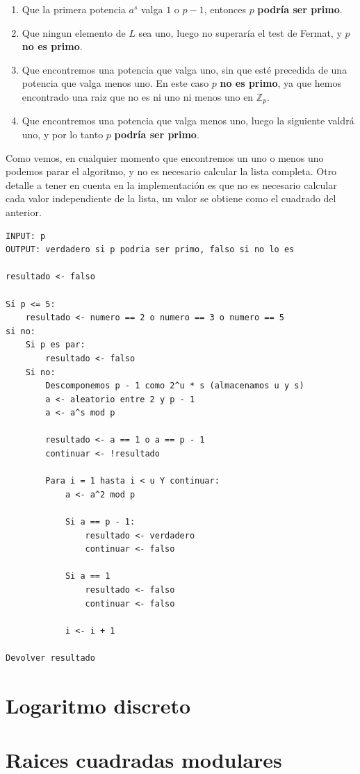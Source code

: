 \documentclass[12pt, spanish]{article}
\begin{document}
\begin{enumerate}
	\item Que la primera potencia $a^s$ valga $1$ o $p - 1$, entonces $p$ \textbf{podría ser primo}.
	\item Que ningun elemento de $L$ sea uno, luego no superaría el test de Fermat, y $p$ \textbf{no es primo}.
	\item Que encontremos una potencia que valga uno, sin que esté precedida de una potencia que valga menos uno. En este caso $p$ \textbf{no es primo}, ya que hemos encontrado una raiz que no es ni uno ni menos uno en $\mathbb{Z}_p$.
	\item Que encontremos una potencia que valga menos uno, luego la siguiente valdrá uno, y por lo tanto $p$ \textbf{podría ser primo}.
\end{enumerate}

Como vemos, en cualquier momento que encontremos un uno o menos uno podemos parar el algoritmo, y no es necesario calcular la lista completa. Otro detalle a tener en cuenta en la implementación es que no es necesario calcular cada valor independiente de la lista, un valor se obtiene como el cuadrado del anterior.

\begin{lstlisting}[caption={Test de Miller-Rabin}]
INPUT: p
OUTPUT: verdadero si p podria ser primo, falso si no lo es

resultado <- falso

Si p <= 5:
	resultado <- numero == 2 o numero == 3 o numero == 5
si no:
	Si p es par:
		resultado <- falso
	Si no:
		Descomponemos p - 1 como 2^u * s (almacenamos u y s)
		a <- aleatorio entre 2 y p - 1
		a <- a^s mod p

		resultado <- a == 1 o a == p - 1
		continuar <- !resultado

		Para i = 1 hasta i < u Y continuar:
			a <- a^2 mod p

			Si a == p - 1:
				resultado <- verdadero
				continuar <- falso

			Si a == 1
				resultado <- falso
				continuar <- falso

			i <- i + 1

Devolver resultado
\end{lstlisting}


\section{Logaritmo discreto}

\section{Raices cuadradas modulares}
\end{document}
